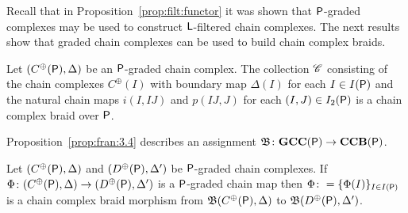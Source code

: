 Recall that in Proposition~\ref{prop:filt:functor} it was shown that ${\mathsf P}$-graded complexes may be used to construct ${\mathsf L}$-filtered chain complexes.  The next results show that graded chain complexes can be used to build chain complex braids.

\begin{prop}\label{prop:fran:3.4}
Let $(C^\oplus({\mathsf P}),\Delta)$ be an ${\mathsf P}$-graded chain complex.  The collection $\mathscr{C}$ consisting of the chain complexes $C^\oplus(I)$ with boundary map $\Delta(I)$ for each $I\in I({\mathsf P})$ and the natural chain maps $i(I,IJ)$ and $p(IJ,J)$ for each $(I,J)\in I_2({\mathsf P})$ is a chain complex braid over ${\mathsf P}$.  
\end{prop}

Proposition~\ref{prop:fran:3.4} describes an assignment $\mathfrak{B}\colon {\bf GCC({\mathsf P})}\to {\bf CCB({\mathsf P})}$.

\begin{prop}\label{prop:UTMap}
Let $(C^\oplus({\mathsf P}),\Delta)$ and $(D^\oplus({\mathsf P}),\Delta')$ be ${\mathsf P}$-graded chain complexes.  If $\Phi\colon (C^\oplus({\mathsf P}),\Delta) \to (D^\oplus({\mathsf P}),\Delta')$ is a ${\mathsf P}$-graded chain map then $\Phi\colon =\{\Phi(I)\}_{I\in I({\mathsf P})}$ is a chain complex braid morphism from $\mathfrak{B}(C^\oplus({\mathsf P}),\Delta)$ to $\mathfrak{B}(D^\oplus({\mathsf P}),\Delta')$.
\end{prop}








